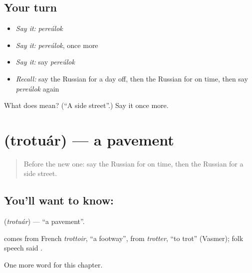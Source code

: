 \subsection*{Your turn}
\begin{itemize}
\raggedright
  \item \emph{Say it:} \emph{pereúlok}
  \item \emph{Say it:} \emph{pereúlok}, once more
  \item \emph{Say it:} say \emph{pereúlok}
  \item \emph{Recall:} say the Russian for a day off, then the Russian for on time, then say \emph{pereúlok} again
\end{itemize}

\begin{tcolorbox}[breakable,colback=teal!4,colframe=teal!35!black,title={Before you move on}]
What does  mean? (\textquotedblleft{}A side street\textquotedblright{}.) Say it once more.
\end{tcolorbox}
\section[\texorpdfstring{\ru{тротуар} (trotuár)}{тротуар (trotuár)}]{ (trotuár) — a pavement}

\label{lesson:RU-C183-trotuar}



\begin{quote}
Before the new one: say the Russian for on time, then the Russian for a side street.
\end{quote}

\subsection*{You'll want to know: }
\textbf{} (\emph{trotuár}) — \textquotedblleft{}a pavement\textquotedblright{}.

\begin{cousinweb}
\textbf{} comes from French \emph{trottoir}, \textquotedblleft{}a footway\textquotedblright{}, from \emph{trotter}, \textquotedblleft{}to trot\textquotedblright{} (Vasmer); folk speech said \emph{}.
\end{cousinweb}

\begin{grammarlens}[title={What you've built}]
One more word for this chapter.
\end{grammarlens}

